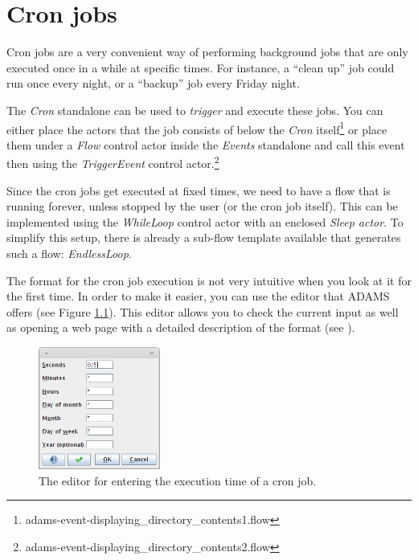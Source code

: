 \documentclass[a4paper]{book}
\begin{document}
\chapter{Cron jobs}
\label{cron}
Cron jobs are a very convenient way of performing background jobs that are only
executed once in a while at specific times. For instance, a ``clean up'' job 
could run once every night, or a ``backup'' job every Friday night.

The \textit{Cron} standalone can be used to \textit{trigger} and execute these 
jobs. You can either place the actors that the job consists of below the 
\textit{Cron} itself\footnote{adams-event-displaying\_directory\_contents1.flow} 
or place them under a \textit{Flow} control actor inside
the \textit{Events} standalone and call this event then using the 
\textit{TriggerEvent} control 
actor.\footnote{adams-event-displaying\_directory\_contents2.flow}

Since the cron jobs get executed at fixed times, we need to have a flow that is
running forever, unless stopped by the user (or the cron job itself). This can 
be implemented using the \textit{WhileLoop} control actor with an enclosed 
\textit{Sleep actor}. To simplify this setup, there is already a sub-flow 
template available that generates such a flow: \textit{EndlessLoop}.

The format for the cron job execution is not very intuitive when you look at it
for the first time. In order to make it easier, you can use the editor that ADAMS
offers (see Figure \ref{cron-editor}). This editor allows you to check the
current input as well as opening a web page with a detailed description of
the format (see \cite{cronformat}).

\begin{figure}[htb]
  \centering
  \includegraphics[width=4.0cm]{images/cron-editor.png}
  \caption{The editor for entering the execution time of a cron job.}
  \label{cron-editor}
\end{figure}


\end{document}
